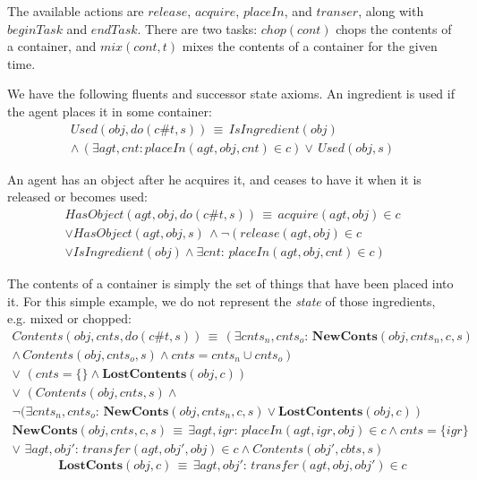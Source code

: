 The available actions are $release$, $acquire$, $placeIn$, and
$transer$, along with $beginTask$ and $endTask$. There are two
tasks: $chop(cont)$ chops the contents of a container, and $mix(cont,t)$
mixes the contents of a container for the given time.

We have the following fluents and successor state axioms. An ingredient
is used if the agent places it in some container:\begin{multline*}
Used(obj,do(c\#t,s))\,\equiv\, IsIngredient(obj)\\
\wedge\,\left(\exists agt,cnt:placeIn(agt,obj,cnt)\in c\right)\vee\, Used(obj,s)\end{multline*}


An agent has an object after he acquires it, and ceases to have it
when it is released or becomes used:\begin{multline*}
HasObject(agt,obj,do(c\#t,s))\,\equiv\, acquire(agt,obj)\in c\\
\vee HasObject(agt,obj,s)\,\wedge\neg\left(release(agt,obj)\in c\right.\\
\left.\vee IsIngredient(obj)\wedge\exists cnt:\, placeIn(agt,obj,cnt)\in c\right)\end{multline*}


The contents of a container is simply the set of things that have
been placed into it. For this simple example, we do not represent
the \emph{state} of those ingredients, e.g. mixed or chopped:\begin{multline*}
Contents(obj,cnts,do(c\#t,s))\,\equiv\,\left(\exists cnts_{n},cnts_{o}:\,\mathbf{NewConts}(obj,cnts_{n},c,s)\right.\\
\left.\wedge\, Contents(obj,cnts_{o},s)\wedge cnts=cnts_{n}\cup cnts_{o}\right)\\
\vee\,\,\left(cnts=\{\}\wedge\mathbf{LostContents}(obj,c)\right)\\
\vee\,\,\left(Contents(obj,cnts,s)\right.\wedge\\
\left.\neg(\exists cnts_{n},cnts_{o}:\,\mathbf{NewConts}(obj,cnts_{n},c,s)\vee\mathbf{LostContents}(obj,c)\right)\end{multline*}
\begin{multline*}
\mathbf{NewConts}(obj,cnts,c,s)\,\equiv\,\exists agt,igr:\, placeIn(agt,igr,obj)\in c\wedge cnts=\{igr\}\\
\vee\,\,\exists agt,obj':\, transfer(agt,obj',obj)\in c\wedge Contents(obj',cbts,s)\end{multline*}
\[
\mathbf{LostConts}(obj,c)\,\equiv\,\exists agt,obj':\, transfer(agt,obj,obj')\in c\]


